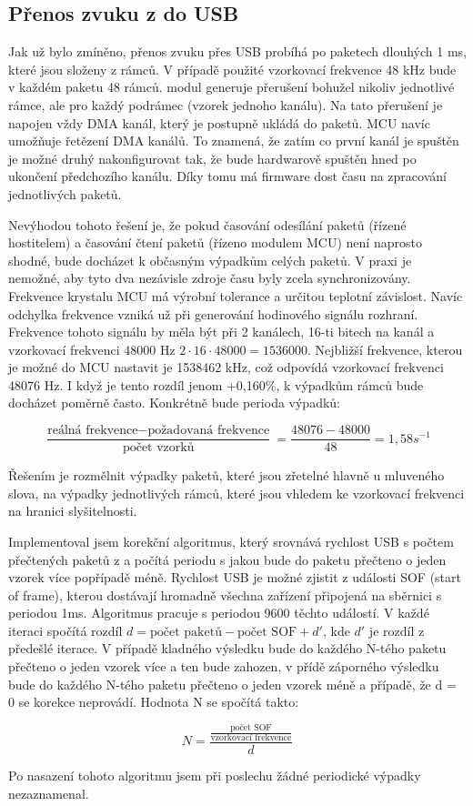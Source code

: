 \subsection{Přenos zvuku z \iis do USB}

Jak už bylo zmíněno, přenos zvuku přes USB probíhá po paketech dlouhých 1 ms, které jsou složeny z rámců. V případě použité vzorkovací frekvence 48 kHz bude v každém paketu 48 rámců.  \iis modul generuje přerušení bohužel nikoliv jednotlivé rámce, ale pro každý podrámec (vzorek jednoho kanálu). Na tato přerušení je napojen vždy DMA kanál, který je postupně ukládá do paketů. MCU  navíc umožňuje řetězení DMA kanálů. To znamená, že zatím co první kanál je spuštěn je možné druhý nakonfigurovat tak, že bude hardwarově spuštěn hned po ukončení předchozího kanálu. Díky tomu má firmware dost času na zpracování jednotlivých paketů.

Nevýhodou tohoto řešení je, že pokud časování odesílání paketů (řízené hostitelem) a časování čtení paketů (řízeno \iis modulem MCU) není naprosto shodné, bude docházet k občasným výpadkům celých paketů. V praxi je nemožné, aby tyto dva nezávisle zdroje času byly zcela synchronizovány. Frekvence krystalu MCU má výrobní tolerance a určitou teplotní závislost. Navíc odchylka frekvence vzniká už při generování hodinového signálu \iis rozhraní. Frekvence tohoto signálu by měla být při 2 kanálech, 16-ti bitech na kanál a vzorkovací frekvenci 48000 Hz $ 2 \cdot 16 \cdot 48000 = 1536000 $. Nejbližší frekvence, kterou je možné do MCU nastavit je 1538462 kHz, což odpovídá vzorkovací frekvenci 48076 Hz. I když je tento rozdíl jenom +0,160\%, k výpadkům rámců bude docházet poměrně často. Konkrétně bude perioda výpadků:

$$ \frac{\mbox{reálná frekvence} - \mbox{požadovaná frekvence}}{\mbox{počet vzorků}} = \frac{48076 - 48000}{48} =  1,58 s^{-1} $$

Řešením je rozmělnit výpadky paketů, které jsou zřetelné hlavně u mluveného slova, na výpadky jednotlivých rámců, které jsou vhledem ke vzorkovací frekvenci na hranici slyšitelnosti. 

Implementoval jsem korekční algoritmus, který srovnává rychlost USB s počtem přečtených paketů z \iis a počítá periodu s jakou bude do paketu přečteno o jeden vzorek více popřípadě méně. Rychlost USB je možné zjistit z události SOF (start of frame), kterou dostávají hromadně všechna zařízení připojená na sběrnici s periodou 1ms. Algoritmus pracuje s periodou 9600 těchto událostí. V každé iteraci spočítá rozdíl $d = \mbox {počet paketů} - \mbox {počet SOF} + d'$, kde $d'$ je rozdíl z předešlé iterace. V případě kladného výsledku bude do každého N-tého paketu přečteno o jeden vzorek více a ten bude zahozen, v přídě záporného výsledku bude do každého N-tého paketu přečteno o jeden vzorek méně a případě, že d = 0 se korekce neprovádí. Hodnota N se spočítá takto:

$$ N = \frac{\frac{\mbox{počet SOF}}{\mbox{vzorkovací frekvence}}}{d} $$

Po nasazení tohoto algoritmu jsem při poslechu žádné periodické výpadky nezaznamenal.